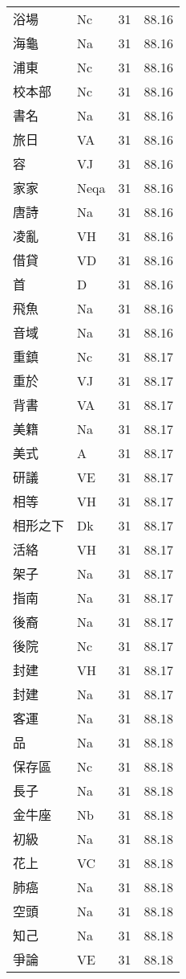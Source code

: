 \documentclass[twocolumn]{book}
\begin{document}
\begin{supertabular}{llrr}
浴場 & Nc & 31 &  88.16\\
海龜 & Na & 31 &  88.16\\
浦東 & Nc & 31 &  88.16\\
校本部 & Nc & 31 &  88.16\\
書名 & Na & 31 &  88.16\\
旅日 & VA & 31 &  88.16\\
容 & VJ & 31 &  88.16\\
家家 & Neqa & 31 &  88.16\\
唐詩 & Na & 31 &  88.16\\
凌亂 & VH & 31 &  88.16\\
借貸 & VD & 31 &  88.16\\
首 & D & 31 &  88.16\\
飛魚 & Na & 31 &  88.16\\
音域 & Na & 31 &  88.16\\
重鎮 & Nc & 31 &  88.17\\
重於 & VJ & 31 &  88.17\\
背書 & VA & 31 &  88.17\\
美籍 & Na & 31 &  88.17\\
美式 & A & 31 &  88.17\\
研議 & VE & 31 &  88.17\\
相等 & VH & 31 &  88.17\\
相形之下 & Dk & 31 &  88.17\\
活絡 & VH & 31 &  88.17\\
架子 & Na & 31 &  88.17\\
指南 & Na & 31 &  88.17\\
後裔 & Na & 31 &  88.17\\
後院 & Nc & 31 &  88.17\\
封建 & VH & 31 &  88.17\\
封建 & Na & 31 &  88.17\\
客運 & Na & 31 &  88.18\\
品 & Na & 31 &  88.18\\
保存區 & Nc & 31 &  88.18\\
長子 & Na & 31 &  88.18\\
金牛座 & Nb & 31 &  88.18\\
初級 & Na & 31 &  88.18\\
花上 & VC & 31 &  88.18\\
肺癌 & Na & 31 &  88.18\\
空頭 & Na & 31 &  88.18\\
知己 & Na & 31 &  88.18\\
爭論 & VE & 31 &  88.18\\

\end{supertabular}
\end{document}
